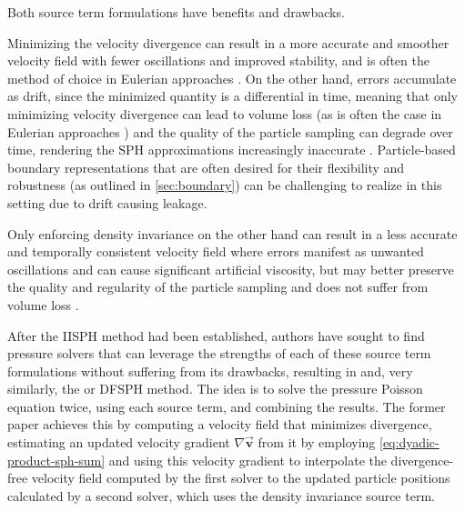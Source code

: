 \documentclass[oneside, a4paper]{book}
\newcommand\vek[1]{\vec{\bm{#1}}}
\begin{document}
    Both source term formulations have benefits and drawbacks. 
    
    Minimizing the velocity divergence can result in a more accurate and smoother velocity field with fewer oscillations and improved stability, and is often the method of choice in Eulerian approaches \autocite{dfsph}. On the other hand, errors accumulate as drift, since the minimized quantity is a differential in time, meaning that only minimizing velocity divergence can lead to volume loss (as is often the case in Eulerian approaches \autocite{dfsph}) and the quality of the particle sampling can degrade over time, rendering the SPH approximations increasingly inaccurate \autocite{optimized-source-term}. Particle-based boundary representations that are often desired for their flexibility and robustness (as outlined in \autoref{sec:boundary}) can be challenging to realize in this setting due to drift causing leakage.

    Only enforcing density invariance on the other hand can result in a less accurate and temporally consistent velocity field where errors manifest as unwanted oscillations and can cause significant artificial viscosity, but may better preserve the quality and regularity of the particle sampling and does not suffer from volume loss \autocite{optimized-source-term}.
    
    After the IISPH method had been established, authors have sought to find pressure solvers that can leverage the strengths of each of these source term formulations without suffering from its drawbacks, resulting in \autocite[more optimized source term formulations]{optimized-source-term} and, very similarly, the \autocite[Divergence-Free SPH]{dfsph} or DFSPH method. The idea is to solve the pressure Poisson equation twice, using each source term, and combining the results. 
    The former paper achieves this by computing a velocity field that minimizes divergence, estimating an updated velocity gradient $\nabla\vek{v}$ from it by employing \autoref{eq:dyadic-product-sph-sum} and using this velocity gradient to interpolate the divergence-free velocity field computed by the first solver to the updated particle positions calculated by a second solver, which uses the density invariance source term. 
\end{document}

